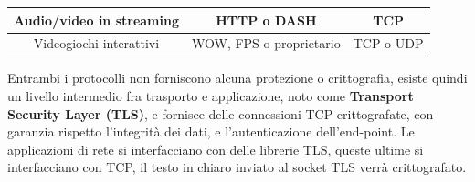 \documentclass[12pt, letterpaper]{article}
\begin{document}
\begin{center}
\begin{tabular}{|c|c|c|}
        Audio/video in streaming & HTTP o DASH                                                                          & TCP                                                                                  \\ \hline
        \rowcolor[HTML]{EFEFEF}
        Videogiochi interattivi  & WOW, FPS o proprietario                                                              & \cellcolor[HTML]{EFEFEF}TCP o UDP                                                    \\ \hline
    \end{tabular}
\end{center}
Entrambi i protocolli non forniscono alcuna protezione o crittografia, esiste quindi un livello
intermedio fra trasporto e applicazione, noto come \textbf{Transport Security Layer (TLS)}, e fornisce
delle connessioni TCP crittografate, con garanzia rispetto l'integrità dei dati, e l'autenticazione
dell'end-point. Le applicazioni di rete si interfacciano con delle librerie TLS, queste ultime si
interfacciano con TCP, il testo in chiaro inviato al socket TLS verrà crittografato.
\end{document}
